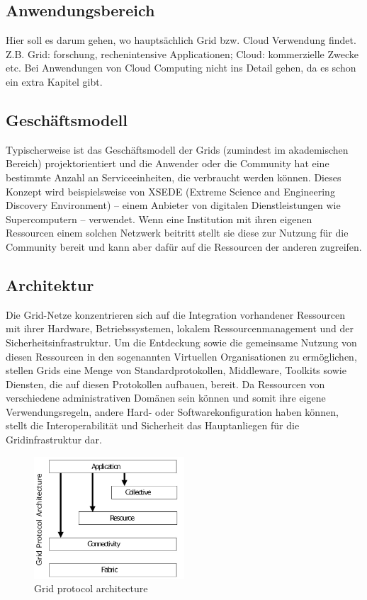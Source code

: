 \subsection{Anwendungsbereich}

Hier soll es darum gehen, wo hauptsächlich Grid bzw. Cloud Verwendung findet. Z.B. Grid: forschung, rechenintensive Applicationen; Cloud: kommerzielle Zwecke etc.
Bei Anwendungen von Cloud Computing nicht ins Detail gehen, da es schon ein extra Kapitel gibt.

\subsection{Geschäftsmodell}
Typischerweise ist das Geschäftsmodell der Grids (zumindest im akademischen Bereich) projektorientiert und die Anwender oder die Community hat eine bestimmte Anzahl an Serviceeinheiten, die verbraucht werden können\cite{360-degree-compared}.  
Dieses Konzept wird beispielsweise von XSEDE (Extreme Science and Engineering Discovery Environment) -- einem Anbieter von digitalen Dienstleistungen wie Supercomputern -- verwendet\cite{xsede}.
Wenn eine Institution mit ihren eigenen Ressourcen einem solchen Netzwerk beitritt stellt sie diese zur Nutzung für die Community bereit und kann aber dafür auf die Ressourcen der anderen zugreifen\cite{360-degree-compared}.

\subsection{Architektur}
Die Grid-Netze konzentrieren sich auf die Integration vorhandener Ressourcen mit ihrer Hardware, Betriebssystemen, lokalem Ressourcenmanagement und der Sicherheitsinfrastruktur.
Um die Entdeckung sowie die gemeinsame Nutzung von diesen Ressourcen in den sogenannten \glqq Virtuellen Organisationen\grqq{} zu ermöglichen, stellen Grids eine Menge von Standardprotokollen, Middleware, Toolkits sowie Diensten, die auf diesen Protokollen aufbauen, bereit.
Da Ressourcen von verschiedene administrativen Domänen sein können und somit ihre eigene Verwendungsregeln, andere Hard- oder Softwarekonfiguration haben können, stellt die Interoperabilität und Sicherheit das Hauptanliegen für die Gridinfrastruktur dar.\cite{360-degree-compared}

\begin{figure}[ht]
	\centering
  \includegraphics[width=0.5\textwidth]{res/grid-protocol-arch.jpg}
	\caption{Grid protocol architecture\cite{360-degree-compared}}
	\label{gpa}
\end{figure}

